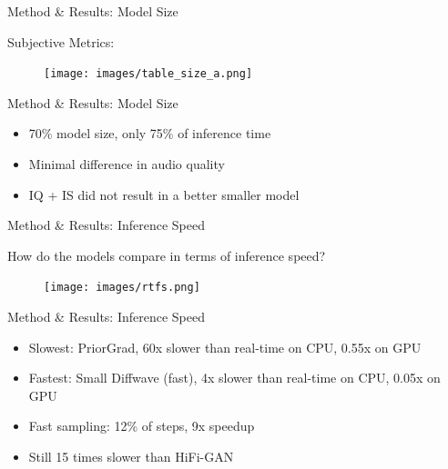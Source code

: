 \documentclass{beamer}
\begin{document}

\begin{frame}{Method \& Results: Model Size}

    Subjective Metrics:

    \begin{figure}
        \centering
        \texttt{[image: images/table\_size\_a.png]}
    \end{figure}

\end{frame}


\begin{frame}{Method \& Results: Model Size}

    \begin{itemize}
        \setlength\itemsep{1.5em}
        \item 70\% model size, only 75\% of inference time
        \pause
        \item Minimal difference in audio quality
        \pause
        \item IQ + IS did not result in a better smaller model
    \end{itemize}

\end{frame}


\begin{frame}{Method \& Results: Inference Speed}

    How do the models compare in terms of inference speed?

    \vspace{0.5cm}

    \begin{figure}
        \centering
        \texttt{[image: images/rtfs.png]}
    \end{figure}

\end{frame}


\begin{frame}{Method \& Results: Inference Speed}

    \begin{itemize}
        \setlength\itemsep{1.5em}
        \item Slowest: PriorGrad, 60x slower than real-time on CPU, 0.55x on GPU
        \pause
        \item Fastest: Small Diffwave (fast), 4x slower than real-time on CPU, 0.05x on GPU
        \pause
        \item Fast sampling: 12\% of steps, 9x speedup
        \pause
        \item Still 15 times slower than HiFi-GAN
    \end{itemize}

\end{frame}
\end{document}
